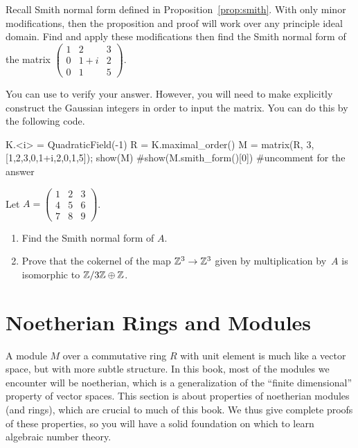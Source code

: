 \begin{exercise}
	Recall Smith normal form defined in Proposition~\ref{prop:smith}. With only minor modifications, then the proposition and proof will work over any principle ideal domain. Find and apply these modifications then find the Smith normal form of the matrix $\begin{pmatrix} 1 & 2 & 3 \\ 0 & 1+i & 2 \\ 0 & 1 & 5 \end{pmatrix}$.
	
	\begin{hint}
		You can use \sage{} to verify your answer. However, you will need to make explicitly construct the Gaussian integers in order to input the matrix. You can do this by the following code.
	\end{hint}
	\begin{sagecode}
	\begin{sagecell}
K.<i> = QuadraticField(-1)
R = K.maximal_order()
M = matrix(R, 3, [1,2,3,0,1+i,2,0,1,5]); show(M)
#show(M.smith_form()[0]) #uncomment for the answer
	\end{sagecell}
	\end{sagecode}
\end{exercise}

\begin{exercise}
	Let $A=\left(
	        \begin{matrix}1&2&3\\4&5&6\\7&8&9
	        \end{matrix}\right)$.
	\begin{enumerate}
	\item Find the Smith normal form of $A$.
	\item Prove that
	the cokernel of the map $\mathbb{Z}^3\to \mathbb{Z}^3$ given by multiplication by~$A$
	is isomorphic to $\mathbb{Z}/3\mathbb{Z} \oplus \mathbb{Z}$.
	\end{enumerate}
\end{exercise}

\section{Noetherian Rings and Modules}\label{sec:noetherian}

A module $M$ over a commutative ring $R$ with unit element is much
like a vector space, but with more subtle structure.  In this book,
most of the modules we encounter will be noetherian, which is a
generalization of the ``finite dimensional'' property of vector
spaces.  This section is about properties of noetherian modules (and
rings), which are crucial to much of this book.  We thus
give complete proofs of these properties, so you will have a solid
foundation on which to learn algebraic number theory.

